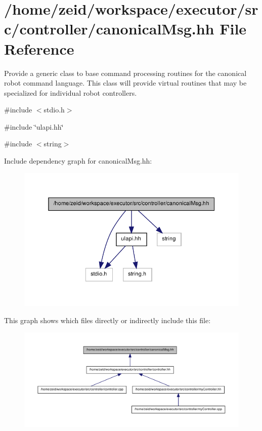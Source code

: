 \hypertarget{canonical_msg_8hh}{
\section{/home/zeid/workspace/executor/src/controller/canonicalMsg.hh File Reference}
\label{canonical_msg_8hh}
}


Provide a generic class to base command processing routines for the canonical robot command language. This class will provide virtual routines that may be specialized for individual robot controllers.  


{\ttfamily \#include $<$stdio.h$>$}\par
{\ttfamily \#include \char`\"{}ulapi.hh\char`\"{}}\par
{\ttfamily \#include $<$string$>$}\par
Include dependency graph for canonicalMsg.hh:\nopagebreak
\begin{figure}[H]
\begin{center}
\leavevmode
\includegraphics[width=352pt]{canonical_msg_8hh__incl}
\end{center}
\end{figure}
This graph shows which files directly or indirectly include this file:\nopagebreak
\begin{figure}[H]
\begin{center}
\leavevmode
\includegraphics[width=400pt]{canonical_msg_8hh__dep__incl}
\end{center}
\end{figure}
